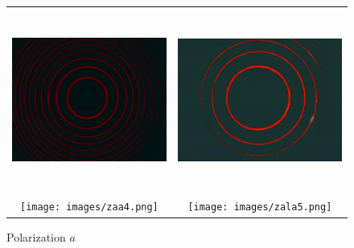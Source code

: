 \documentclass[a4paper,12pt,abstracton]{scrartcl}
\begin{document}
\begin{figure}[H]
    \centering
    \begin{tabular}{c c}
      \includegraphics[height=6cm,keepaspectratio]{images/zna5.png} & \includegraphics[height=6cm,keepaspectratio]{images/znla8.png} \\
      \texttt{[image: images/zaa4.png]} & \texttt{[image: images/zala5.png]} \\
      \end{tabular}
    \caption{Polarization $a$}
    \label{fig:pa}
\end{figure}
\end{document}
